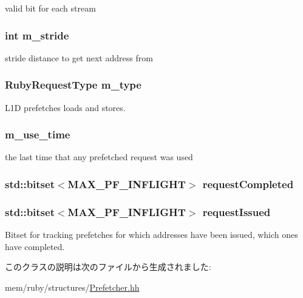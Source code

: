 valid bit for each stream \hypertarget{classPrefetchEntry_a8b3c2bb6e8f9ed6318723fb273cf6b5e}{
\subsubsection[{m\_\-stride}]{\setlength{\rightskip}{0pt plus 5cm}int {\bf m\_\-stride}}}
\label{classPrefetchEntry_a8b3c2bb6e8f9ed6318723fb273cf6b5e}


stride distance to get next address from \hypertarget{classPrefetchEntry_a7d010f0854d320898448eae2da5997f8}{
\subsubsection[{m\_\-type}]{\setlength{\rightskip}{0pt plus 5cm}RubyRequestType {\bf m\_\-type}}}
\label{classPrefetchEntry_a7d010f0854d320898448eae2da5997f8}


L1D prefetches loads and stores. \hypertarget{classPrefetchEntry_a2f044fe87b9fd71df60401cbbb9b57f8}{
\subsubsection[{m\_\-use\_\-time}]{ {\bf m\_\-use\_\-time}}}
\label{classPrefetchEntry_a2f044fe87b9fd71df60401cbbb9b57f8}


the last time that any prefetched request was used \hypertarget{classPrefetchEntry_a341ad93f9c76b96f1e7c344829d846b4}{
\subsubsection[{requestCompleted}]{\setlength{\rightskip}{0pt plus 5cm}std::bitset$<$MAX\_\-PF\_\-INFLIGHT$>$ {\bf requestCompleted}}}
\label{classPrefetchEntry_a341ad93f9c76b96f1e7c344829d846b4}
\hypertarget{classPrefetchEntry_a6b5dd4a5a1dcdda3d0d502f6658547a4}{
\subsubsection[{requestIssued}]{\setlength{\rightskip}{0pt plus 5cm}std::bitset$<$MAX\_\-PF\_\-INFLIGHT$>$ {\bf requestIssued}}}
\label{classPrefetchEntry_a6b5dd4a5a1dcdda3d0d502f6658547a4}
Bitset for tracking prefetches for which addresses have been issued, which ones have completed. 

このクラスの説明は次のファイルから生成されました:\begin{DoxyCompactItemize}
\item 
mem/ruby/structures/\hyperlink{Prefetcher_8hh}{Prefetcher.hh}\end{DoxyCompactItemize}
